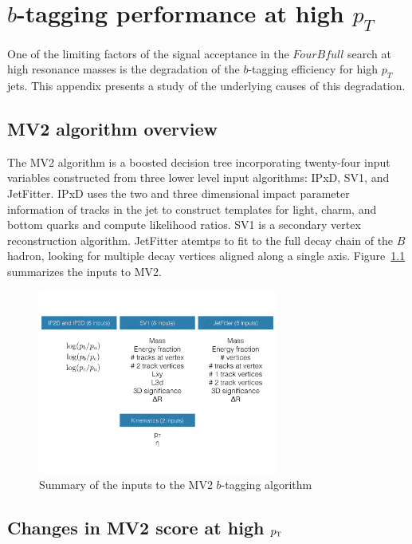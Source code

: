 \chapter{$b$-tagging performance at high $p_{T}$}
\label{AppendixB}

One of the limiting factors of the signal acceptance in the $FourBfull$ search at high resonance masses is the degradation of the $b$-tagging efficiency for high $p_{T}$ jets. This appendix presents a study of the underlying causes of this degradation. 

\section{MV2 algorithm overview}

The MV2 algorithm is a boosted decision tree incorporating twenty-four input variables constructed from three lower level input algorithms: IPxD, SV1, and JetFitter. IPxD uses the two and three dimensional impact parameter information of tracks in the jet to construct templates for light, charm, and bottom quarks and compute likelihood ratios. SV1 is a secondary vertex reconstruction algorithm. JetFitter atemtps to fit to the full decay chain of the $B$ hadron, looking for multiple decay vertices aligned along a single axis. Figure~\ref{fig:MV2inputs} summarizes the inputs to MV2. 

\begin{figure}[h!]
  \centering
  \captionsetup{justification=centering}

  \includegraphics[width=0.7\textwidth]{figures/MV2_inputs}
  \caption{Summary of the inputs to the MV2 $b$-tagging algorithm}
  \label{fig:MV2inputs}
\end{figure}

\section{Changes in MV2 score at high $p_{\textrm{\footnotesize\sc t}}$}


